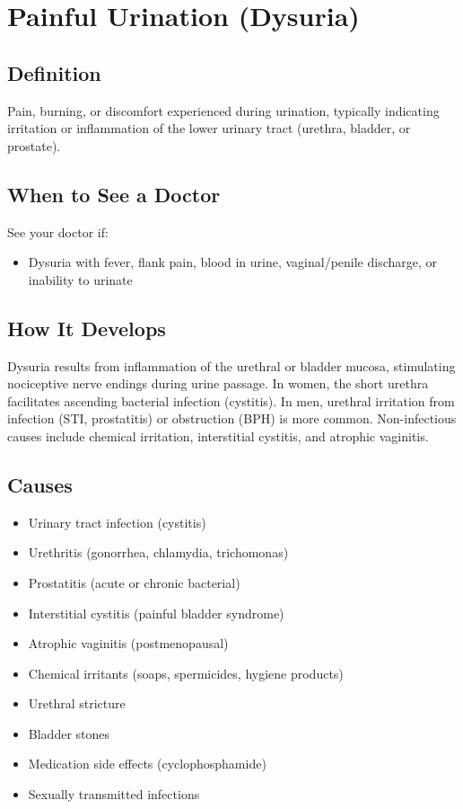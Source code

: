 \chapter{Painful Urination (Dysuria)}

\section*{Definition}
Pain, burning, or discomfort experienced during urination, typically indicating irritation or inflammation of the lower urinary tract (urethra, bladder, or prostate).

\section*{When to See a Doctor}
See your doctor if:
\begin{itemize}
  \item Dysuria with fever, flank pain, blood in urine, vaginal/penile discharge, or inability to urinate
\end{itemize}

\section*{How It Develops}
Dysuria results from inflammation of the urethral or bladder mucosa, stimulating nociceptive nerve endings during urine passage. In women, the short urethra facilitates ascending bacterial infection (cystitis). In men, urethral irritation from infection (STI, prostatitis) or obstruction (BPH) is more common. Non-infectious causes include chemical irritation, interstitial cystitis, and atrophic vaginitis.

\section*{Causes}
\begin{itemize}
  \item Urinary tract infection (cystitis)
  \item Urethritis (gonorrhea, chlamydia, trichomonas)
  \item Prostatitis (acute or chronic bacterial)
  \item Interstitial cystitis (painful bladder syndrome)
  \item Atrophic vaginitis (postmenopausal)
  \item Chemical irritants (soaps, spermicides, hygiene products)
  \item Urethral stricture
  \item Bladder stones
  \item Medication side effects (cyclophosphamide)
  \item Sexually transmitted infections
\end{itemize}

